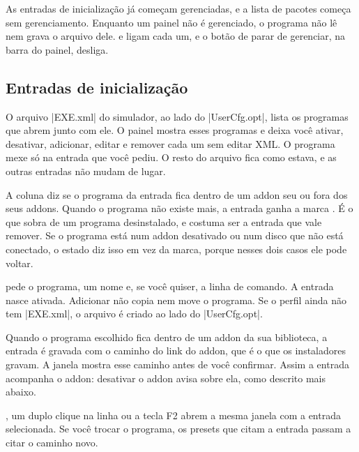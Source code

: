 \documentclass[11pt,a4paper]{article}
\begin{document}
As entradas de inicialização já começam gerenciadas, e a lista de pacotes
começa sem gerenciamento. Enquanto um painel não é gerenciado, o programa não lê
nem grava o arquivo dele.  e
 ligam cada um, e o botão de parar de
gerenciar, na barra do painel, desliga.

\subsection{Entradas de inicialização}

O arquivo \where|EXE.xml| do simulador, ao lado do \where|UserCfg.opt|, lista os
programas que abrem junto com ele. O painel 
mostra esses programas e deixa você ativar, desativar, adicionar, editar e
remover cada um sem editar XML. O programa mexe só na entrada que você pediu. O
resto do arquivo fica como estava, e as outras entradas não mudam de lugar.


A coluna  diz se o programa da entrada fica dentro de um addon seu ou
fora dos seus addons. Quando o programa não existe mais, a entrada ganha a marca
. É o que sobra de um programa desinstalado, e
costuma ser a entrada que vale remover. Se o programa está num addon desativado
ou num disco que não está conectado, o estado diz isso em vez da marca, porque
nesses dois casos ele pode voltar.

 pede o programa, um nome e, se você quiser, a linha de comando. A
entrada nasce ativada. Adicionar não copia nem move o programa. Se o perfil
ainda não tem \where|EXE.xml|, o arquivo é criado ao lado do
\where|UserCfg.opt|.


Quando o programa escolhido fica dentro de um addon da sua biblioteca, a entrada
é gravada com o caminho do link do addon, que é o que os instaladores gravam. A
janela mostra esse caminho antes de você confirmar. Assim a entrada acompanha o
addon: desativar o addon avisa sobre ela, como descrito mais abaixo.

, um duplo clique na linha ou a tecla F2 abrem a mesma janela com a
entrada selecionada. Se você trocar o programa, os presets que citam a entrada
passam a citar o caminho novo.
\end{document}
